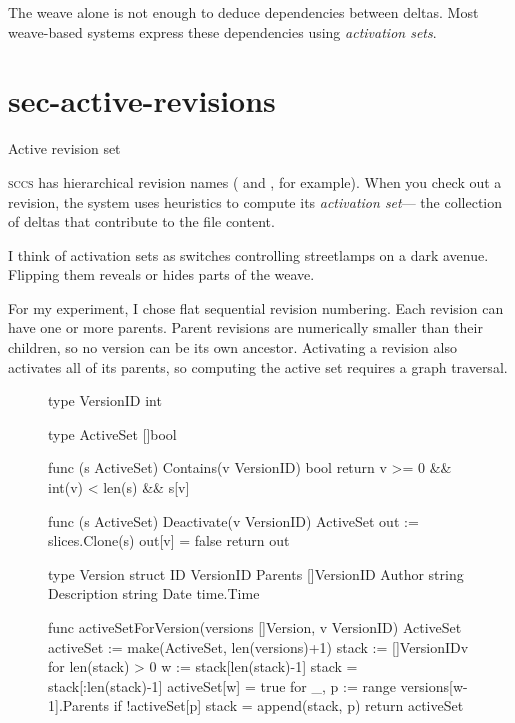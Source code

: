 \documentclass{article}
\begin{document}
The weave alone is not enough to deduce dependencies between deltas.
Most weave-based systems express these dependencies using \emph{activation sets}.

\section{sec-active-revisions}{Active revision set}

\textsc{sccs} has hierarchical revision names ( and , for example).
When you check out a revision,
the system uses heuristics to compute its \emph{activation set}---%
the collection of deltas that contribute to the file content.

I think of activation sets as switches controlling streetlamps on a dark avenue.
Flipping them reveals or hides parts of the weave.

For my experiment,
I chose flat sequential revision numbering.
Each revision can have one or more parents.
Parent revisions are numerically smaller than their children,
so no version can be its own ancestor.
Activating a revision also activates all of its parents,
so computing the active set requires a graph traversal.

\begin{figure}
\begin{code}[go]
type VersionID int

type ActiveSet []bool

func (s ActiveSet) Contains(v VersionID) bool {
	return v >= 0 && int(v) < len(s) && s[v]
}

func (s ActiveSet) Deactivate(v VersionID) ActiveSet {
	out := slices.Clone(s)
	out[v] = false
	return out
}

type Version struct {
	ID          VersionID
	Parents     []VersionID
	Author      string
	Description string
	Date        time.Time
}

func activeSetForVersion(versions []Version, v VersionID) ActiveSet {
	activeSet := make(ActiveSet, len(versions)+1)
	stack := []VersionID{v}
	for len(stack) > 0 {
		w := stack[len(stack)-1]
		stack = stack[:len(stack)-1]
		activeSet[w] = true
		for _, p := range versions[w-1].Parents {
			if !activeSet[p] {
				stack = append(stack, p)
			}
		}
	}
	return activeSet
}
\end{code}
\end{figure}
\end{document}
